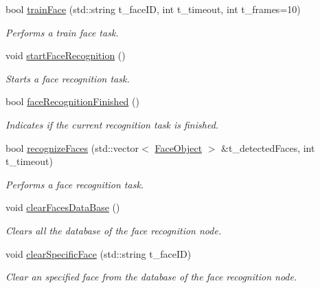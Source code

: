 \begin{DoxyCompactItemize}
bool \hyperlink{class_face_recognition_tasks_ac37de471cb7aa80b2a15a4a7d63d4221}{train\+Face} (std\+::string t\+\_\+face\+ID, int t\+\_\+timeout, int t\+\_\+frames=10)
\begin{DoxyCompactList}\small\item\em Performs a train face task. \end{DoxyCompactList}\item 
void \hyperlink{class_face_recognition_tasks_aa7095ceda4a0a124349a7dc0d8daf48d}{start\+Face\+Recognition} ()
\begin{DoxyCompactList}\small\item\em Starts a face recognition task. \end{DoxyCompactList}\item 
bool \hyperlink{class_face_recognition_tasks_ad33d493055a9ffca2878d81830cfe84a}{face\+Recognition\+Finished} ()
\begin{DoxyCompactList}\small\item\em Indicates if the current recognition task is finished. \end{DoxyCompactList}\item 
bool \hyperlink{class_face_recognition_tasks_a6f7c7e3ee0582afc908511bb12644cd2}{recognize\+Faces} (std\+::vector$<$ \hyperlink{struct_face_recognition_tasks_1_1_face_object}{Face\+Object} $>$ \&t\+\_\+detected\+Faces, int t\+\_\+timeout)
\begin{DoxyCompactList}\small\item\em Performs a face recognition task. \end{DoxyCompactList}\item 
void \hyperlink{class_face_recognition_tasks_abd3d414ffa7862d467527644e547e75f}{clear\+Faces\+Data\+Base} ()\hypertarget{class_face_recognition_tasks_abd3d414ffa7862d467527644e547e75f}{}\label{class_face_recognition_tasks_abd3d414ffa7862d467527644e547e75f}

\begin{DoxyCompactList}\small\item\em Clears all the database of the face recognition node. \end{DoxyCompactList}\item 
void \hyperlink{class_face_recognition_tasks_ad5ba2fdb1fbd1dff9d6ee3027d7fcfc2}{clear\+Specific\+Face} (std\+::string t\+\_\+face\+ID)
\begin{DoxyCompactList}\small\item\em Clear an specified face from the database of the face recognition node. \end{DoxyCompactList}\end{DoxyCompactItemize}


